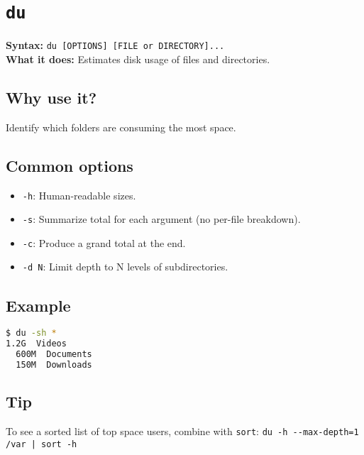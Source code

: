 \documentclass[10pt,oneside]{scrbook}
\begin{document}
\section{\texttt{du}}
\begin{cmdbox}
  \textbf{Syntax:} \lstinline!du [OPTIONS] [FILE or DIRECTORY]...! \\
  \textbf{What it does:} Estimates disk usage of files and directories.
\end{cmdbox}
\begin{commanddetails}
  \subsection*{Why use it?}
    Identify which folders are consuming the most space.

  \subsection*{Common options}
    \begin{itemize}
      \item \lstinline!-h!: Human-readable sizes.  
      \item \lstinline!-s!: Summarize total for each argument (no per-file breakdown).  
      \item \lstinline!-c!: Produce a grand total at the end.  
      \item \lstinline!-d N!: Limit depth to N levels of subdirectories.  
    \end{itemize}

  \subsection*{Example}
  \begin{lstlisting}[language=bash]
$ du -sh *
1.2G  Videos
  600M  Documents
  150M  Downloads
  \end{lstlisting}

  \subsection*{Tip}
    To see a sorted list of top space users, combine with \texttt{sort}:  
    \lstinline!du -h --max-depth=1 /var | sort -h!  
\end{commanddetails}
\end{document}
